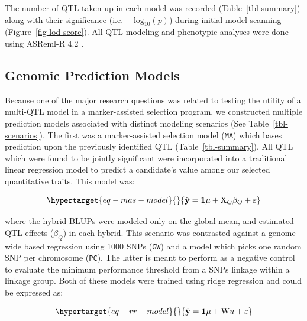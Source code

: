 The number of QTL taken up in each model was recorded
(Table~\ref{tbl-summary}) along with their significance
(i.e.~\(- \mathrm{log}_{10}(p)\)) during initial model scanning
(Figure~\ref{fig-lod-score}). All QTL modeling and phenotypic analyses
were done using ASReml-R 4.2 \autocite{Butler2017}.

\subsection{Genomic Prediction Models}\label{genomic-prediction-models}

Because one of the major research questions was related to testing the
utility of a multi-QTL model in a marker-assisted selection program, we constructed
multiple prediction models associated with distinct modeling scenarios
(See Table~\ref{tbl-scenarios}). The first was a marker-assisted
selection model (\texttt{MA}) which bases prediction upon the previously
identified QTL (Table~\ref{tbl-summary}). All QTL which were found to be
jointly significant were incorporated into a traditional linear
regression model to predict a candidate's value among our selected
quantitative traits. This model was:

\begin{equation}\protect\hypertarget{eq-mas-model}{}{ \hat{\mathbf{y}} = \mathbf{1}\mu + \mathrm{X}_Q\beta_Q + \varepsilon }\label{eq-mas-model}\end{equation}

where the hybrid BLUPs were modeled only on the global mean, and
estimated QTL effects (\(\beta_Q\)) in each hybrid. This scenario was
contrasted against a genome-wide based regression using 1000 SNPs
(\texttt{GW}) and a model which picks one random SNP per chromosome
(\texttt{PC}). The latter is meant to perform as a negative control to
evaluate the minimum performance threshold from a SNPs linkage within a
linkage group. Both of these models were trained using ridge
regression and could be expressed as:

\begin{equation}\protect\hypertarget{eq-rr-model}{}{ \hat{\mathbf{y}} =  \mathbf{1}\mu + \mathrm{W}u + \varepsilon }\label{eq-rr-model}\end{equation}

